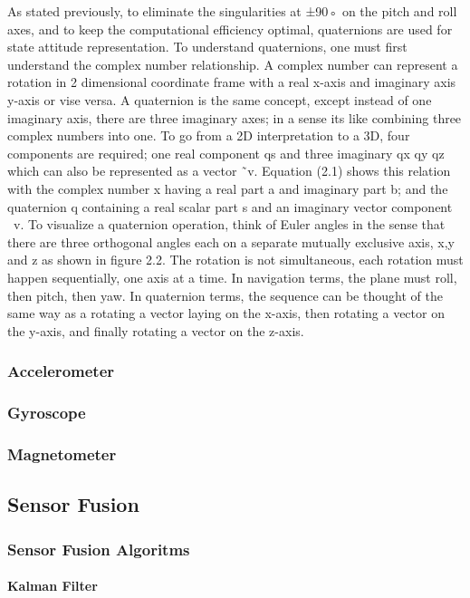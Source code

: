 As stated previously, to eliminate the singularities at ±90◦ on the pitch and roll axes, and to keep the computational efficiency optimal, quaternions are used for state attitude representation. To understand quaternions, one must first understand the complex number
relationship. A complex number can represent a rotation in 2 dimensional coordinate frame
with a real x-axis and imaginary axis y-axis or vise versa.
A quaternion is the same concept, except instead of one imaginary axis, there are three
imaginary axes; in a sense its like combining three complex numbers into one. To go from a
2D interpretation to a 3D, four components are required; one real component qs and three
imaginary qx qy qz which can also be represented as a vector ˜v. Equation (2.1) shows this
relation with the complex number x having a real part a and imaginary part b; and the
quaternion q containing a real scalar part s and an imaginary vector component ~v.
To visualize a quaternion operation, think of Euler angles in the sense that there are
three orthogonal angles each on a separate mutually exclusive axis, x,y and z as shown in
figure 2.2. The rotation is not simultaneous, each rotation must happen sequentially, one
axis at a time. In navigation terms, the plane must roll, then pitch, then yaw. In quaternion
terms, the sequence can be thought of the same way as a rotating a vector laying on the
x-axis, then rotating a vector on the y-axis, and finally rotating a vector on the z-axis.

\subsubsection{Accelerometer}
\subsubsection{Gyroscope}
\subsubsection{Magnetometer}
\subsection{Sensor Fusion}
\subsubsection{Sensor Fusion Algoritms}
\paragraph{Kalman Filter}

